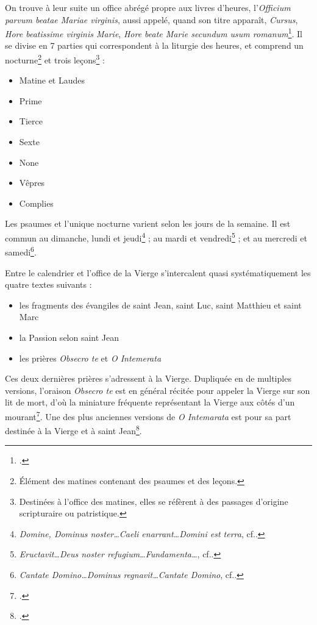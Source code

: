 \documentclass[a4paper,12pt,twoside]{book}
\begin{document}
	On trouve à leur suite un office abrégé propre aux livres d'heures, l'\textit{Officium parvum beatae Mariae virginis}, aussi appelé, quand son titre apparaît, \textit{Cursus}, \textit{Hore beatissime virginis Marie}, \textit{Hore beate Marie secundum usum romanum}\footcite[p. XVII]{Leroquais_notices}. Il se divise en 7 parties qui correspondent à la liturgie des heures, et comprend un nocturne\footnote{Élément des matines contenant des psaumes et des leçons.} et trois leçons\footnote{Destinées à l'office des matines, elles se réfèrent à des passages d'origine scripturaire ou patristique.} :
	\begin{itemize}
	    \item Matine et Laudes
	    \item Prime
	    \item Tierce
	    \item Sexte
	    \item None
	    \item Vêpres
	    \item Complies
	\end{itemize}
	Les psaumes et l'unique nocturne varient selon les jours de la semaine. Il est commun au dimanche, lundi et jeudi\footnote{\textit{Domine, Dominus noster…Caeli enarrant…Domini est terra}, cf.\cite[p. XVII]{Leroquais_notices}.} ; au mardi et vendredi\footnote{\textit{Eructavit…Deus noster refugium…Fundamenta…}, cf.\cite[p. XVII]{Leroquais_notices}.} ; et au mercredi et samedi\footnote{\textit{Cantate Domino…Dominus regnavit…Cantate Domino}, cf.\cite[p. XVII]{Leroquais_notices}.}.
	
	Entre le calendrier et l'office de la Vierge s'intercalent quasi systématiquement les quatre textes suivants : 
	\begin{itemize}
	    \item les fragments des évangiles de saint Jean, saint Luc, saint Matthieu et saint Marc
	    \item la Passion selon saint Jean
	    \item les prières \textit{Obsecro te} et \textit{O Intemerata}
	\end{itemize}
	Ces deux dernières prières s'adressent à la Vierge. Dupliquée en de multiples versions, l'oraison \textit{Obsecro te} est en général récitée pour appeler la Vierge sur son lit de mort, d'où la miniature fréquente représentant la Vierge aux côtés d'un mourant\footcite[p. XXXIII-XXIV]{V_L}. Une des plus anciennes versions de \textit{O Intemarata} est pour sa part destinée à la Vierge et à saint Jean\footcite[p. XXV]{Leroquais_notices}.\\
	
\end{document}
